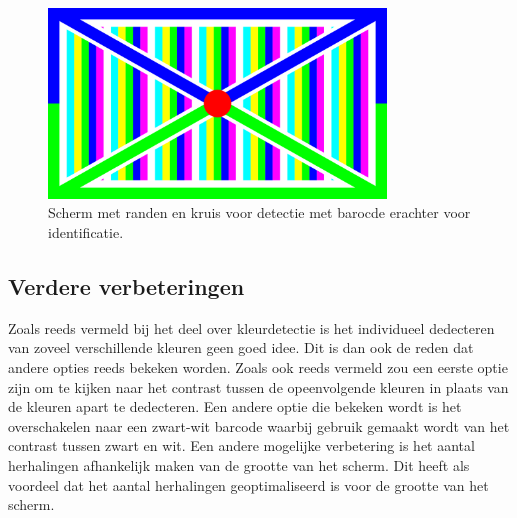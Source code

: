 \begin{figure}[h!]
\centering
\includegraphics[width=0.8\textwidth]{img/screen.png}
\caption{Scherm met randen en kruis voor detectie met barocde erachter voor identificatie.}
\end{figure}

\subsection{Verdere verbeteringen}
Zoals reeds vermeld bij het deel over kleurdetectie is het individueel dedecteren van zoveel verschillende kleuren geen goed idee. Dit is dan ook de reden dat andere opties reeds bekeken worden. Zoals ook reeds vermeld zou een eerste optie zijn om te kijken naar het contrast tussen de opeenvolgende kleuren in plaats van de kleuren apart te dedecteren. Een andere optie die bekeken wordt is het overschakelen naar een zwart-wit barcode waarbij gebruik gemaakt wordt van het contrast tussen zwart en wit. Een andere mogelijke verbetering is het aantal herhalingen afhankelijk maken van de grootte van het scherm. Dit heeft als voordeel dat het aantal herhalingen geoptimaliseerd is voor de grootte van het scherm.
